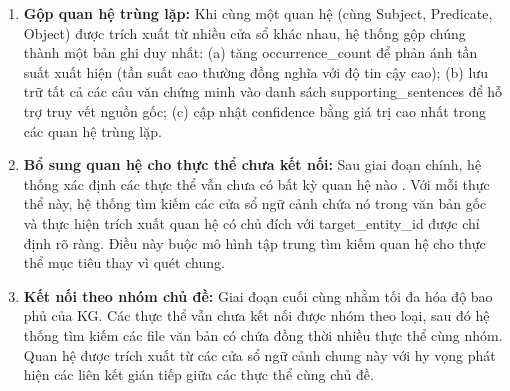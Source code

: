 \begin{enumerate}
    \item \textbf{Gộp quan hệ trùng lặp:} Khi cùng một quan hệ (cùng Subject, Predicate, Object) được trích xuất từ nhiều cửa sổ khác nhau, hệ thống gộp chúng thành một bản ghi duy nhất: (a) tăng occurrence\_count để phản ánh tần suất xuất hiện (tần suất cao thường đồng nghĩa với độ tin cậy cao); (b) lưu trữ tất cả các câu văn chứng minh vào danh sách supporting\_sentences để hỗ trợ truy vết nguồn gốc; (c) cập nhật confidence bằng giá trị cao nhất trong các quan hệ trùng lặp.

    \item \textbf{Bổ sung quan hệ cho thực thể chưa kết nối:} Sau giai đoạn chính, hệ thống xác định các thực thể vẫn chưa có bất kỳ quan hệ nào . Với mỗi thực thể này, hệ thống tìm kiếm các cửa sổ ngữ cảnh chứa nó trong văn bản gốc và thực hiện trích xuất quan hệ có chủ đích với target\_entity\_id được chỉ định rõ ràng. Điều này buộc mô hình tập trung tìm kiếm quan hệ cho thực thể mục tiêu thay vì quét chung.

    \item \textbf{Kết nối theo nhóm chủ đề:} Giai đoạn cuối cùng nhằm tối đa hóa độ bao phủ của KG. Các thực thể vẫn chưa kết nối được nhóm theo loại, sau đó hệ thống tìm kiếm các file văn bản có chứa đồng thời nhiều thực thể cùng nhóm. Quan hệ được trích xuất từ các cửa sổ ngữ cảnh chung này với hy vọng phát hiện các liên kết gián tiếp giữa các thực thể cùng chủ đề.
\end{enumerate}


